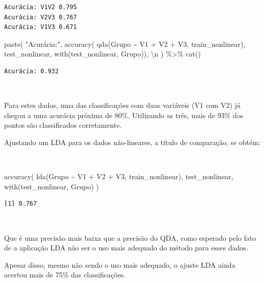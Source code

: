 \documentclass[
  a4paperpaper,
]{article}
\newenvironment{Shaded}{\begin{snugshade}}{\end{snugshade}}
\newcommand{\FunctionTok}[1]{\textcolor[rgb]{0.28,0.35,0.67}{#1}}
\newcommand{\NormalTok}[1]{\textcolor[rgb]{0.00,0.23,0.31}{#1}}
\newcommand{\SpecialCharTok}[1]{\textcolor[rgb]{0.37,0.37,0.37}{#1}}
\newcommand{\StringTok}[1]{\textcolor[rgb]{0.13,0.47,0.30}{#1}}
\begin{document}
\begin{verbatim}
Acurácia: V1V2 0.795 
Acurácia: V2V3 0.767 
Acurácia: V1V3 0.671 
\end{verbatim}

\begin{Shaded}
\begin{Highlighting}[]
\FunctionTok{paste}\NormalTok{(}
  \StringTok{"Acurácia:"}\NormalTok{, }\FunctionTok{accuracy}\NormalTok{(}
    \FunctionTok{qda}\NormalTok{(Grupo }\SpecialCharTok{\textasciitilde{}}\NormalTok{ V1 }\SpecialCharTok{+}\NormalTok{ V2 }\SpecialCharTok{+}\NormalTok{ V3, train\_nonlinear),}
\NormalTok{    test\_nonlinear,}
    \FunctionTok{with}\NormalTok{(test\_nonlinear, Grupo)), }\StringTok{\textquotesingle{}}\SpecialCharTok{\textbackslash{}n}\StringTok{\textquotesingle{}}
\NormalTok{) }\SpecialCharTok{\%\textgreater{}\%}
  \FunctionTok{cat}\NormalTok{()}
\end{Highlighting}
\end{Shaded}

\begin{verbatim}
Acurácia: 0.932 
\end{verbatim}

~

Para estes dados, uma das classificações com duas variáveis (V1 com V2)
já chegou a uma acurácia próxima de 80\%. Utilizando as três, mais de
93\% dos pontos são classificados corretamente.

Ajustando um LDA para os dados não-lineares, a título de comparação, se
obtém:

~

\begin{Shaded}
\begin{Highlighting}[]
\FunctionTok{accuracy}\NormalTok{(}
  \FunctionTok{lda}\NormalTok{(Grupo }\SpecialCharTok{\textasciitilde{}}\NormalTok{ V1 }\SpecialCharTok{+}\NormalTok{ V2 }\SpecialCharTok{+}\NormalTok{ V3, train\_nonlinear),}
\NormalTok{  test\_nonlinear, }\FunctionTok{with}\NormalTok{(test\_nonlinear, Grupo)}
\NormalTok{)}
\end{Highlighting}
\end{Shaded}

\begin{verbatim}
[1] 0.767
\end{verbatim}

~

Que é uma precisão mais baixa que a precisão do QDA, como esperado pelo
fato de a aplicação LDA não ser o uso mais adequado do método para esses
dados.

Apesar disso, mesmo não sendo o uso mais adequado, o ajuste LDA ainda
acertou mais de 75\% das classificações.
\end{document}
